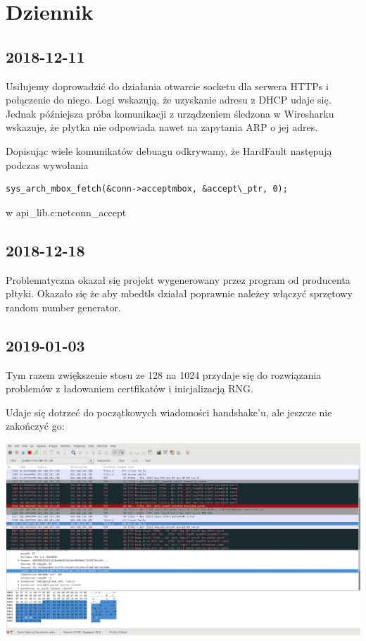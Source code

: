 \newpage
\section{Dziennik}

\subsection{2018-12-11}
Usiłujemy doprowadzić do działania otwarcie socketu dla serwera HTTPs i połączenie do niego.
Logi wskazują, że uzyskanie adresu z DHCP udaje się. Jednak późniejsza próba komunikacji 
z urządzeniem śledzona w Wiresharku wskazuje, że płytka nie odpowiada nawet na zapytania ARP o 
jej adres.

Dopisując wiele komunikatów debuagu odkrywamy, że HardFault następują podczas 
wywołania 
\begin{verbatim}
sys_arch_mbox_fetch(&conn->acceptmbox, &accept\_ptr, 0);
\end{verbatim}
w api\_lib.c:netconn\_accept
 
 \subsection{2018-12-18}
Problematyczna okazał się projekt wygenerowany przez program od producenta płtyki. Okazało się że
aby mbedtls działał poprawnie należey włączyć sprzętowy random number generator.

\subsection{2019-01-03}
Tym razem zwiększenie stosu ze 128 na 1024 przydaje się do rozwiązania problemów z ładowaniem 
certfikatów i inicjalizacją RNG.

Udaje się dotrzeć do początkowych wiadomości handshake’u, ale jeszcze nie zakończyć go:

\includegraphics[width=\linewidth]{./images/1.png}


